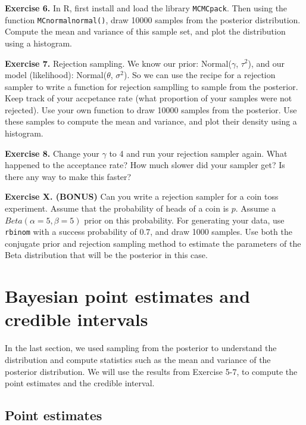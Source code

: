 \documentclass[
]{book}
\begin{document}
\textbf{Exercise 6.} In R, first install and load the library \texttt{MCMCpack}. Then using the function \texttt{MCnormalnormal()}, draw 10000 samples from the posterior distribution. Compute the mean and variance of this sample set, and plot the distribution using a histogram.

\textbf{Exercise 7.} Rejection sampling. We know our prior: Normal(\(\gamma\), \(\tau^2\)), and our model (likelihood): Normal(\(\theta\), \(\sigma^2\)). So we can use the recipe for a rejection sampler to write a function for rejection samplling to sample from the posterior. Keep track of your accpetance rate (what proportion of your samples were not rejected). Use your own function to draw 10000 samples from the posterior. Use these samples to compute the mean and variance, and plot their density using a histogram.

\textbf{Exercise 8.} Change your \(\gamma\) to 4 and run your rejection sampler again. What happened to the acceptance rate? How much slower did your sampler get? Is there any way to make this faster?

\textbf{Exercise X. (BONUS)} Can you write a rejection sampler for a coin toss experiment. Assume that the probability of heads of a coin is \(p\). Assume a \(Beta(\alpha=5, \beta=5)\) prior on this probability. For generating your data, use \texttt{rbinom} with a success probability of 0.7, and draw 1000 samples. Use both the conjugate prior and rejection sampling method to estimate the parameters of the Beta distribution that will be the posterior in this case.

\hypertarget{bayesian-point-estimates-and-credible-intervals}{%
\section{Bayesian point estimates and credible intervals}\label{bayesian-point-estimates-and-credible-intervals}}

In the last section, we used sampling from the posterior to understand the distribution and compute statistics such as the mean and variance of the posterior distribution. We will use the results from Exercise 5-7, to compute the point estimates and the credible interval.

\hypertarget{point-estimates}{%
\subsection{Point estimates}\label{point-estimates}}
\end{document}
